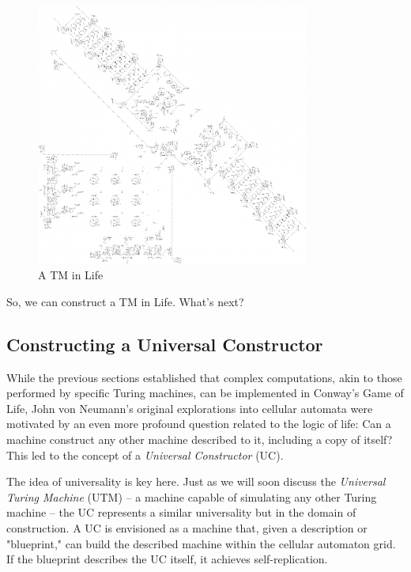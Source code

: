 \documentclass{article}
\theoremstyle{definition}
\theoremstyle{plain}
\theoremstyle{plain}
\begin{document}
\begin{figure}[H]
  \centering
  \includegraphics[width=0.8\textwidth]{figures/TM.png} %
   \caption{A TM in Life \cite{Rendell_2005_TM}}
  \label{fig:utm-in-life}
\end{figure}

So, we can construct a TM in Life. What's next?

\subsection{Constructing a Universal Constructor \cite{Burks_1970_Essays}} 
While the previous sections established that complex computations, akin to those performed by specific Turing machines, can be implemented in Conway's Game of Life, John von Neumann's original explorations into cellular automata were motivated by an even more profound question related to the logic of life: Can a machine construct any other machine described to it, including a copy of itself? This led to the concept of a \textit{Universal Constructor} (UC).

The idea of universality is key here. Just as we will soon discuss the \textit{Universal Turing Machine} (UTM) – a machine capable of simulating any other Turing machine – the UC represents a similar universality but in the domain of construction. A UC is envisioned as a machine that, given a description or "blueprint," can build the described machine within the cellular automaton grid. If the blueprint describes the UC itself, it achieves self-replication.
\end{document}
